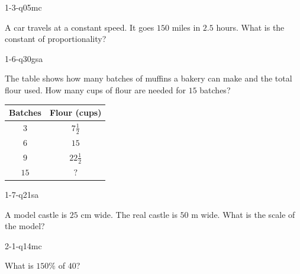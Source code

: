
\begin{practiceQuestion}{1-3-q05}{mc}
\begin{questionText}
A car travels at a constant speed. It goes $150$ miles in $2.5$ hours. What is the constant of proportionality?
\end{questionText}
\end{practiceQuestion}

\begin{practiceQuestion}{1-6-q30}{gsa}
\begin{questionText}
The table shows how many batches of muffins a bakery can make and the total flour used. How many cups of flour are needed for $15$ batches?

\begin{center}
\begin{tabular}{|c|c|}
\hline
\textbf{Batches} & \textbf{Flour (cups)} \\ \hline
$3$ & $7\frac{1}{2}$ \\ \hline
$6$ & $15$ \\ \hline
$9$ & $22\frac{1}{2}$ \\ \hline
$15$ & $?$ \\ \hline
\end{tabular}
\end{center}
\end{questionText}
\end{practiceQuestion}

\begin{practiceQuestion}{1-7-q21}{sa}
\begin{questionText}
A model castle is $25$ cm wide. The real castle is $50$ m wide. What is the scale of the model?
\end{questionText}
\end{practiceQuestion}

\begin{practiceQuestion}{2-1-q14}{mc}
\begin{questionText}
What is $150\%$ of $40$?
\end{questionText}
\end{practiceQuestion}

